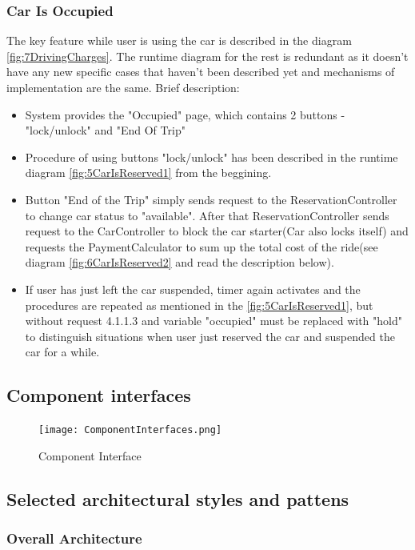 \documentclass[12pt, letterpaper]{article}
\begin{document}
\subsubsection{Car Is Occupied}
The key feature while user is using the car is described in the diagram \ref{fig:7DrivingCharges}. The runtime diagram for the rest is redundant as it doesn't have any new specific cases that haven't been described yet and mechanisms of implementation are the same. Brief description:
\begin{itemize}
	\item System provides the "Occupied" page, which contains 2 buttons - "lock/unlock" and "End Of Trip"
	\item Procedure of using buttons "lock/unlock" has been described in the runtime diagram \ref{fig:5CarIsReserved1} from the beggining.
	\item Button "End of the Trip" simply sends request to the ReservationController to change car status to "available". After that ReservationController sends request to the CarController to block the car starter(Car also locks itself) and requests the PaymentCalculator to sum up the total cost of the ride(see diagram \ref{fig:6CarIsReserved2} and read the description below).
	\item If user has just left the car suspended, timer again activates and the procedures are repeated as mentioned in the \ref{fig:5CarIsReserved1}, but without request 4.1.1.3 and variable "occupied" must be replaced with "hold" to distinguish situations when user just reserved the car and suspended the car for a while.
\end{itemize}  
\newpage

\subsection{Component interfaces}
\begin{figure}[H]
\centering
\texttt{[image: ComponentInterfaces.png]} 
\caption{Component Interface}
\label{fig:CompInter}
\end{figure}

\subsection{Selected architectural styles and pattens}
\subsubsection{Overall Architecture}
\end{document}
